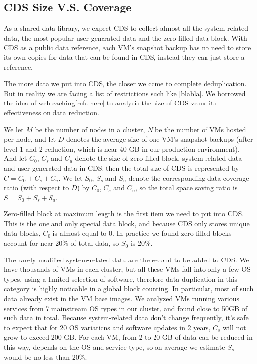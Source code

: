 \subsection{CDS Size V.S. Coverage}
As a shared data library, we expect CDS to collect almost all the system related data, the most popular user-generated data and the zero-filled data block.
With CDS as a public data reference, each VM's snapshot backup has no need to store its own copies for data that can be found in CDS, instead they can just
store a reference.

The more data we put into CDS, the closer we come to complete deduplication. But in reality we are facing a list of restrictions such like [blabla].
We borrowed the idea of web caching[refs here] to analysis the size of CDS vesus its effectiveness on data reduction.

We let $M$ be the number of nodes in a cluster, $N$ be the number of VMs hosted per node,
and let $D$ denotes the average size of one VM's snapshot backups (after level 1 and 2 reduction, which is near 40 GB in our production environment).
And let $C_0$, $C_s$ and $C_u$ denote the size of zero-filled block, system-related data and user-generated data in CDS,
then the total size of CDS is represented by $C=C_0+C_s+C_u$.
We let $S_0$, $S_s$ and $S_u$ denote the corresponding data coverage ratio (with respect to $D$) by $C_0$, $C_s$ and $C_u$,
so the total space saving ratio is $S=S_0+S_s+S_u$.

Zero-filled block at maximum length is the first item we need to put into CDS. This is the one and only special data block, 
and because CDS only stores unique data blocks, $C_0$ is almost equal to 0. In practice we found zero-filled blocks account
for near 20\% of total data, so $S_0$ is 20\%.

The rarely modified system-related data are the second to be added to CDS. We have thousands of VMs in each cluster, 
but all these VMs fall into only a few OS types, using a limited selection of software, therefore data duplication in this category
is highly noticable in a global block counting. In particular, most of such data already exist in the VM base images. 
We analyzed VMs running various services from 7 mainstream OS types in our cluster, and found close to 50GB of such data in total. 
Because system-related data don't change frequently, it's safe to expect that for 20 OS variations 
and software updates in 2 years, $C_s$ will not grow to exceed 200 GB.
For each VM, from 2 to 20 GB of data can be reduced in this way, depends on the OS and service type, so on average we estimate
$S_s$ would be no less than 20\%.

